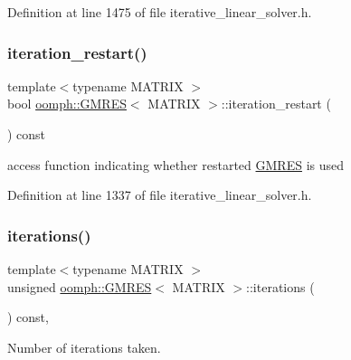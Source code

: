 Definition at line 1475 of file iterative\+\_\+linear\+\_\+solver.\+h.

\mbox{\label{classoomph_1_1GMRES_aee2cac6885b0b9a3e73337eb02dc96d7}} 
\subsubsection{\texorpdfstring{iteration\+\_\+restart()}{iteration\_restart()}}
{\footnotesize\ttfamily template$<$typename M\+A\+T\+R\+IX $>$ \\
bool \hyperlink{classoomph_1_1GMRES}{oomph\+::\+G\+M\+R\+ES}$<$ M\+A\+T\+R\+IX $>$\+::iteration\+\_\+restart (\begin{DoxyParamCaption}{ }\end{DoxyParamCaption}) const\hspace{0.3cm}{\ttfamily [inline]}}



access function indicating whether restarted \hyperlink{classoomph_1_1GMRES}{G\+M\+R\+ES} is used 



Definition at line 1337 of file iterative\+\_\+linear\+\_\+solver.\+h.

\mbox{\label{classoomph_1_1GMRES_a879927e08b79ad4744a10b360ccd5ff3}} 
\subsubsection{\texorpdfstring{iterations()}{iterations()}}
{\footnotesize\ttfamily template$<$typename M\+A\+T\+R\+IX $>$ \\
unsigned \hyperlink{classoomph_1_1GMRES}{oomph\+::\+G\+M\+R\+ES}$<$ M\+A\+T\+R\+IX $>$\+::iterations (\begin{DoxyParamCaption}{ }\end{DoxyParamCaption}) const\hspace{0.3cm}{\ttfamily [inline]}, {\ttfamily [virtual]}}



Number of iterations taken. 



